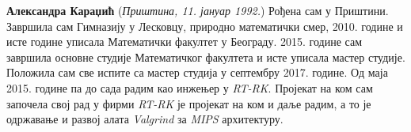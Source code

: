 \documentclass[12pt,oneside]{memoir}
\begin{document}
\literatura

\backmatter


\begin{biografija}
\textbf{Александра Караџић} (\emph{Приштина, 11. јануар 1992.}) Рођена сам у Приштини. Завршила сам Гимназију у Лесковцу, природно математички смер, 2010. године и исте године уписала Математички факултет у Београду. 2015. године сам завршила основне студије Математичког факултета и исте уписала мастер студије. Положила сам све испите са мастер студија у септембру 2017. године. Од маја 2015. године па до сада радим као инжењер у \textit{RT-RK}. Пројекат на ком сам започела свој рад у фирми \textit{RT-RK} је пројекат на ком и даље радим, а то је одржавање и развој алата \textit{Valgrind} за \textit{MIPS} архитектуру.
\end{biografija}
\end{document}
